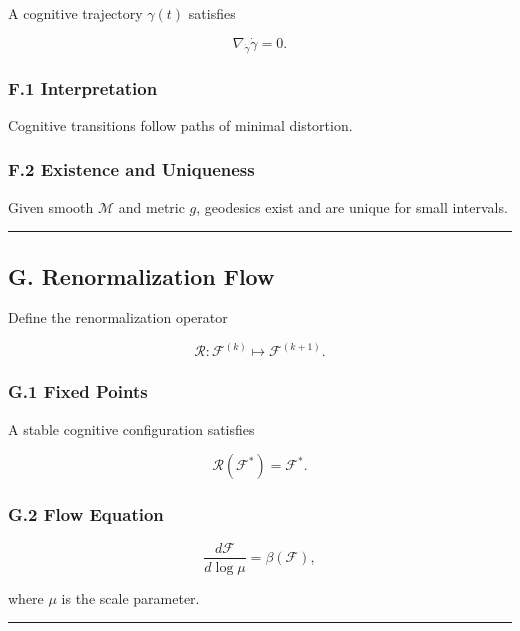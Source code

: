 A cognitive trajectory \(\gamma(t)\) satisfies

\[
\nabla_{\dot{\gamma}} \dot{\gamma} = 0.
\]

\subsubsection{F.1 Interpretation}\label{f.1-interpretation}

Cognitive transitions follow paths of minimal distortion.

\subsubsection{F.2 Existence and Uniqueness}\label{f.2-existence-and-uniqueness}

Given smooth \(\mathcal{M}\) and metric \(g\), geodesics exist and are unique for small intervals.

\begin{center}\rule{0.5\linewidth}{0.5pt}\end{center}

\subsection{G. Renormalization Flow}\label{g.-renormalization-flow}

Define the renormalization operator

\[
\mathcal{R} : \mathcal{F}^{(k)} \mapsto \mathcal{F}^{(k+1)}.
\]

\subsubsection{G.1 Fixed Points}\label{g.1-fixed-points}

A stable cognitive configuration satisfies

\[
\mathcal{R}(\mathcal{F}^\ast) = \mathcal{F}^\ast.
\]

\subsubsection{G.2 Flow Equation}\label{g.2-flow-equation}

\[
\frac{d\mathcal{F}}{d\log \mu} = \beta(\mathcal{F}),
\]

where \(\mu\) is the scale parameter.

\begin{center}\rule{0.5\linewidth}{0.5pt}\end{center}

